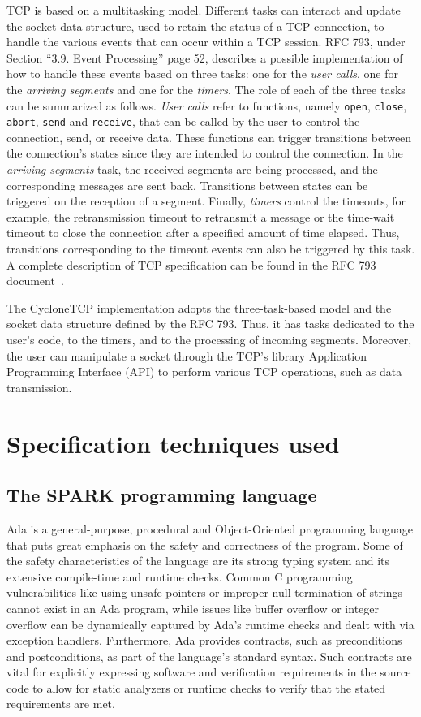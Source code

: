 \documentclass[conference]{IEEEtran}
\begin{document}
TCP is based on a multitasking model. Different tasks can interact and update the socket data structure, used to retain the status of a TCP connection, to handle the various events that can occur within a TCP session. RFC 793, under Section ``3.9. Event Processing'' page 52, describes a possible implementation of how to handle these events based on three tasks: one for the \emph{user calls}, one for the \emph{arriving segments} and one for the \emph{timers}. The role of each of the three tasks can be summarized as follows. \textit{User calls} refer to functions, namely \texttt{open}, \texttt{close}, \texttt{abort}, \texttt{send} and \texttt{receive}, that can be called by the user to control the connection, send, or receive data. These functions can trigger transitions between the connection's states since they are intended to control the connection. In the \textit{arriving segments} task, the received segments are being processed,
and the corresponding messages are sent back. Transitions between states can be triggered on the reception of a segment. Finally, \textit{timers} control the timeouts, for example, the retransmission timeout to retransmit a message or the time-wait timeout to close the connection after a specified amount of time elapsed. Thus, transitions corresponding to the timeout events can also be triggered by this task. A complete description of TCP specification can be found in the RFC 793 document~\cite{rfc793}.

The CycloneTCP implementation adopts the three-task-based model and the socket data structure defined by the RFC 793. Thus, it has tasks dedicated to the user's code, to the timers, and to the processing of incoming segments. Moreover, the user can manipulate a socket through the TCP's library Application Programming Interface (API) to perform various TCP operations, such as data transmission.

\section{Specification techniques used}
\label{sec:spec}

\subsection{The SPARK programming language}

Ada is a general-purpose, procedural and Object-Oriented programming language that puts great emphasis on the safety and correctness of the program. Some of the safety characteristics of the language are its strong typing system and its extensive compile-time and runtime checks. Common C programming vulnerabilities like using unsafe pointers or improper null termination of strings cannot exist in an Ada program, while issues like buffer overflow or integer overflow can be dynamically captured by Ada’s runtime checks and dealt with via exception handlers. Furthermore, Ada provides contracts, such as preconditions and postconditions, as part of the language’s standard syntax. Such contracts are vital for explicitly expressing software and verification requirements in the source code to allow for static analyzers or runtime checks to verify that the stated requirements are met.
\end{document}
